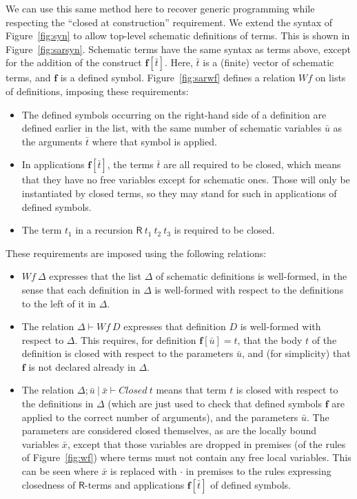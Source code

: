 \documentclass{article}
\begin{document}
We can use this same method here to recover generic programming while
respecting the ``closed at construction'' requirement.  We extend the
syntax of Figure~\ref{fig:syn} to allow top-level schematic
definitions of terms.  This is shown in Figure~\ref{fig:sarsyn}.
Schematic terms have the same syntax as terms above, except
for the addition of the construct $\mathbf{f}[\bar{t}]$.  Here,
$\bar{t}$ is a (finite) vector of schematic terms, and $\mathbf{f}$ is
a defined symbol.  Figure~\ref{fig:sarwf} defines a relation $\textit{Wf}$
on lists of definitions, imposing these requirements:
\begin{itemize}
\item The defined symbols occurring on the right-hand side of a definition
  are defined earlier in the list, with
  the same number of schematic variables $\bar{u}$ as the arguments $\bar{t}$
  where that symbol is applied.
\item In applications $\mathbf{f}[\bar{t}]$, the terms $\bar{t}$ are
  all required to be closed, which means that they have no free variables
  except for schematic ones.  Those will only be instantiated by closed
  terms, so they may stand for such in applications of defined symbols.
\item The term $t_1$ in a recursion $\mathsf{R}\ t_1\ t_2\ t_3$ is
  required to be closed.
  \end{itemize}
These requirements are imposed using the following relations:
\begin{itemize}
\item $\textit{Wf}\ \Delta$ expresses that the list $\Delta$ of
  schematic definitions is well-formed, in the sense that
each definition in $\Delta$ is well-formed with respect to the definitions
to the left of it in $\Delta$.
\item The relation $\Delta \vdash \textit{Wf}\ D$ expresses
  that definition $D$ is well-formed with respect to $\Delta$.  This requires, for definition
  $\mathbf{f}[\bar{u}] = t$, that the body $t$ of the
  definition is closed with respect to the parameters $\bar{u}$, and
  (for simplicity) that $\mathbf{f}$ is not declared already in $\Delta$.
\item The relation $\Delta; \bar{u}\ |\ \bar{x} \vdash
  \textit{Closed}\ t$ means that term $t$ is closed with respect to
  the definitions in $\Delta$ (which are just used to check that
  defined symbols $\mathbf{f}$ are applied to the correct number of
  arguments), and the parameters $\bar{u}$.  The parameters are
  considered closed themselves, as are the locally bound variables
  $\bar{x}$, except that those variables are dropped in premises
  (of the rules of Figure~\ref{fig:wf}) where
  terms must not contain any free local variables.  This can be seen
  where $\bar{x}$ is replaced with $\cdot$ in premises to the rules
  expressing closedness of $\mathsf{R}$-terms and applications
  $\mathbf{f}[\bar{t}]$ of defined symbols.
\end{itemize}
\end{document}
